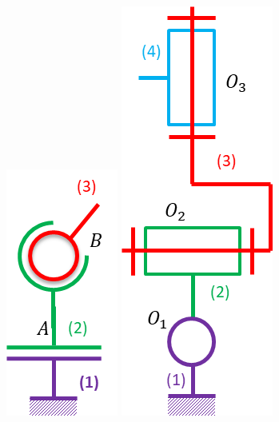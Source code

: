 \documentclass[10pt,fleqn]{article} %
\begin{document}
\begin{multicols}{2}
\begin{multicols}{2}
\begin{center}
\includegraphics[width=.3\linewidth]{images/fig_11.png}
\hspace{1cm}
\includegraphics[width=.25\linewidth]{images/fig_12.png}
\end{center}

\ifprof
\end{multicols}
\else
\end{multicols}
\fi
\end{document}
